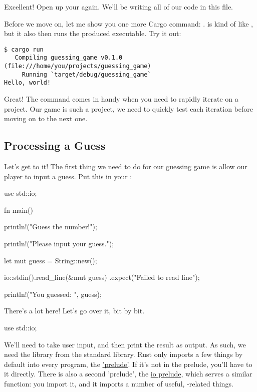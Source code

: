 Excellent! Open up your  again. We'll be writing all of our code in this file.

\blank

Before we move on, let me show you one more Cargo command: .  is kind of like , 
but it also then runs the produced executable. Try it out:

\begin{verbatim}
$ cargo run
   Compiling guessing_game v0.1.0 (file:///home/you/projects/guessing_game)
     Running `target/debug/guessing_game`
Hello, world!
\end{verbatim}

Great! The  command comes in handy when you need to rapidly iterate on a project. Our game is such a project, we 
need to quickly test each iteration before moving on to the next one.

\subsection{Processing a Guess}

Let's get to it! The first thing we need to do for our guessing game is allow our player to input a guess. Put this in your 
:

\begin{rustc}
use std::io;

fn main() {
    println!("Guess the number!");

    println!("Please input your guess.");

    let mut guess = String::new();

    io::stdin().read_line(&mut guess)
        .expect("Failed to read line");

    println!("You guessed: {}", guess);
}
\end{rustc}

There's a lot here! Let's go over it, bit by bit.

\begin{rustc}
use std::io;
\end{rustc}

We'll need to take user input, and then print the result as output. As such, we need the  library from the standard 
library. Rust only imports a few things by default into every program, the \href{https://doc.rust-lang.org/std/prelude/}{'prelude'}.
If it's not in the prelude, you'll have to  it directly. There is also a second 'prelude', the 
\href{https://doc.rust-lang.org/std/io/prelude/}{io prelude}, which serves a similar function: you import it, and it imports a 
number of useful, -related things.

